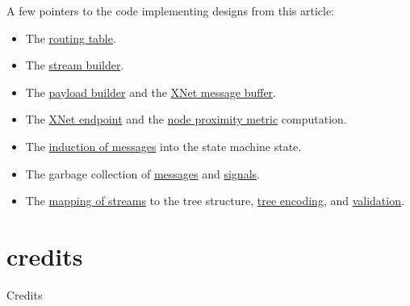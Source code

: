 \documentclass{article}
\begin{document}
A few pointers to the code implementing designs from this article:
\begin{itemize}
  \item The \href{https://github.com/dfinity/ic/blob/226faa85b945aabf0fc22a18b4c2e1b9f0f4c8ee/rs/registry/routing_table/src/lib.rs#L213}{routing table}.
  \item The \href{https://github.com/dfinity/ic/blob/226faa85b945aabf0fc22a18b4c2e1b9f0f4c8ee/rs/messaging/src/routing/stream_builder.rs#L237}{stream builder}.
  \item The \href{https://github.com/dfinity/ic/blob/226faa85b945aabf0fc22a18b4c2e1b9f0f4c8ee/rs/xnet/payload_builder/src/lib.rs#L665}{payload builder} and the \href{https://github.com/dfinity/ic/blob/226faa85b945aabf0fc22a18b4c2e1b9f0f4c8ee/rs/xnet/payload_builder/src/certified_slice_pool.rs#L1042}{XNet message buffer}.
  \item The \href{https://github.com/dfinity/ic/blob/226faa85b945aabf0fc22a18b4c2e1b9f0f4c8ee/rs/xnet/endpoint/src/lib.rs#L93}{XNet endpoint} and the \href{https://github.com/dfinity/ic/blob/226faa85b945aabf0fc22a18b4c2e1b9f0f4c8ee/rs/xnet/payload_builder/src/proximity.rs#L118}{node proximity metric} computation.
  \item The \href{https://github.com/dfinity/ic/blob/226faa85b945aabf0fc22a18b4c2e1b9f0f4c8ee/rs/messaging/src/routing/stream_handler.rs#L557}{induction of messages} into the state machine state.
  \item The garbage collection of \href{https://github.com/dfinity/ic/blob/226faa85b945aabf0fc22a18b4c2e1b9f0f4c8ee/rs/messaging/src/routing/stream_handler.rs#L391-L426}{messages} and \href{https://github.com/dfinity/ic/blob/226faa85b945aabf0fc22a18b4c2e1b9f0f4c8ee/rs/messaging/src/routing/stream_handler.rs#L428-L465}{signals}.
  \item The \href{https://github.com/dfinity/ic/blob/226faa85b945aabf0fc22a18b4c2e1b9f0f4c8ee/rs/canonical_state/src/lazy_tree/conversion.rs#L254-L284}{mapping of streams} to the tree structure, \href{https://github.com/dfinity/ic/blob/226faa85b945aabf0fc22a18b4c2e1b9f0f4c8ee/rs/state_manager/src/stream_encoding.rs#L40}{tree encoding}, and \href{https://github.com/dfinity/ic/blob/226faa85b945aabf0fc22a18b4c2e1b9f0f4c8ee/rs/state_manager/src/lib.rs#L2912-L2972}{validation}.
\end{itemize}

\section{credits}{Credits}
\end{document}
